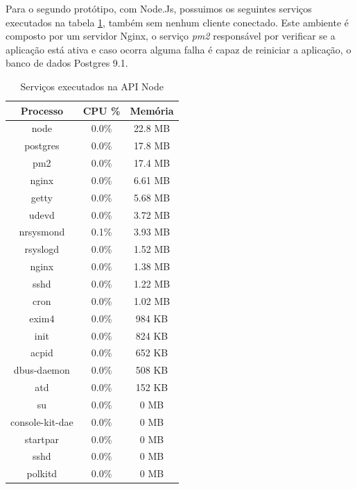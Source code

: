   \vspace{-1.9cm}

  Para o segundo protótipo, com Node.Js, possuimos os seguintes serviços executados na tabela \ref{tab:services-in-api-node}, 
  também sem nenhum cliente conectado. Este ambiente é composto por um servidor Nginx, o serviço \textit{pm2} responsável por
  verificar se a aplicação está ativa e caso ocorra alguma falha é capaz de reiniciar a aplicação, 
  o banco de dados Postgres 9.1.
  
   \begin{table}[H]
    \centering
    \footnotesize
    \setlength{\abovecaptionskip}{0pt}
    \setlength{\belowcaptionskip}{0pt}
    \caption[Serviços executados na API Node]{Serviços executados na API Node}
    \label{tab:services-in-api-node}
    \begin{tabular}{c|c|c}
      \hline \hline
      Processo  & 	CPU \% &	Memória \\
      \hline \hline
      node &		0.0\% &		22.8 MB \\
      postgres &	0.0\% &		17.8 MB \\
      pm2 &		0.0\% &		17.4 MB \\
      nginx &		0.0\% &		6.61 MB \\
      getty &		0.0\% &		5.68 MB \\
      udevd &		0.0\% &		3.72 MB \\
      nrsysmond &	0.1\% &		3.93 MB \\
      rsyslogd &	0.0\% &		1.52 MB \\
      nginx &		0.0\% &		1.38 MB \\
      sshd &		0.0\% &		1.22 MB \\
      cron &		0.0\% &		1.02 MB \\
      exim4 &		0.0\% &		984 KB \\
      init &		0.0\% &		824 KB \\
      acpid &		0.0\% &		652 KB \\
      dbus-daemon &	0.0\% &		508 KB \\
      atd &		0.0\% &		152 KB \\
      su &		0.0\% &		0 MB \\
      console-kit-dae &	0.0\% &		0 MB \\
      startpar & 	0.0\% &		0 MB \\
      sshd &		0.0\% &		0 MB \\
      polkitd &		0.0\% &		0 MB \\
      \hline \hline
    \end{tabular}
  \end{table}
   
